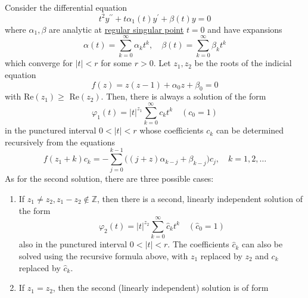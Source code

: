 \documentclass{article}
\newcounter{theorem}[section]
\begin{document}
      \begin{theorem}
        \label{thm:regular-singular-point-theorem-of-2nd-order}
      Consider the differential equation
      \begin{equation}
        t^2 y^{\prime\prime} + t \alpha_1 (t) y^\prime + \beta (t) y = 0
      \end{equation}
      where $\alpha_1, \beta$ are analytic at \hyperref[def:regular-singular-point]{regular singular point} $t = 0$ and have expansions
      \begin{equation}
        \alpha (t) = \sum_{k=0}^\infty \alpha_k t^k, \quad \beta(t) = \sum_{k=0}^\infty \beta_k t^k
      \end{equation}
      which converge for $|t|<r$ for some $r>0$. Let $z_1, z_2$ be the roots of the indicial equation
      \begin{equation}
        f(z) = z(z-1) + \alpha_0 z + \beta_0 = 0
      \end{equation}
      with Re$(z_1) \geq$ Re$(z_2)$. Then, there is always a solution of the form 
      \begin{equation}
        \varphi_1 (t) = |t|^{z_1} \sum_{k=0}^\infty c_k t^k \quad (c_0 = 1)
      \end{equation}
      in the punctured interval $0<|t|<r$ whose coefficients $c_k$ can be determined recursively from the equations
      \begin{equation}
        f(z_1 + k) c_k = - \sum_{j=0}^{k-1} \big((j+z)\alpha_{k-j} + \beta_{k-j}\big) c_j, \quad k = 1, 2, \ldots
      \end{equation}
      As for the second solution, there are three possible cases: 
      \begin{enumerate}
          \item If $z_1 \neq z_2, z_1 - z_2 \not\in \mathbb{Z}$, then there is a second, linearly independent solution of the form 
          \begin{equation}
            \varphi_2 (t) = |t|^{z_2} \sum_{k=0}^\infty \hat{c}_k t^k \quad (\hat{c}_0 = 1)
          \end{equation}
          also in the punctured interval $0 < |t| < r$. The coefficients $\hat{c}_k$ can also be solved using the recursive formula above, with $z_1$ replaced by $z_2$ and $c_k$ replaced by $\hat{c}_k$. 
          \item If $z_1 = z_2$, then the second (linearly independent) solution is of form
          \begin{equation}

\end{equation}
\end{enumerate}
\end{theorem}
\end{document}
